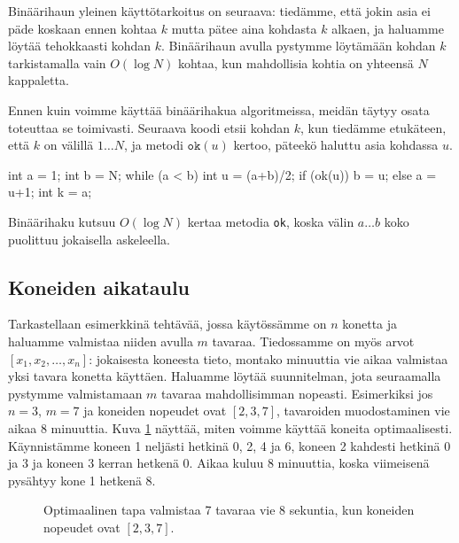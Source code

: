 Binäärihaun yleinen käyttötarkoitus on seuraava:
tiedämme, että jokin asia ei päde koskaan ennen kohtaa $k$
mutta pätee aina kohdasta $k$ alkaen,
ja haluamme löytää tehokkaasti kohdan $k$.
Binäärihaun avulla pystymme löytämään kohdan $k$
tarkistamalla vain $O(\log N)$ kohtaa,
kun mahdollisia kohtia on yhteensä $N$ kappaletta.

Ennen kuin voimme käyttää binäärihakua algoritmeissa,
meidän täytyy osata toteuttaa se toimivasti.
Seuraava koodi etsii kohdan $k$,
kun tiedämme etukäteen, että $k$ on välillä $1 \dots N$,
ja metodi $\texttt{ok}(u)$ kertoo, päteekö haluttu asia
kohdassa $u$.

\begin{code}
int a = 1;
int b = N;
while (a < b) {
    int u = (a+b)/2;
    if (ok(u)) b = u;
    else a = u+1;
}
int k = a;
\end{code}

Binäärihaku kutsuu $O(\log N)$ kertaa metodia \texttt{ok},
koska välin $a \dots b$ koko puolittuu jokaisella askeleella.

\subsection{Koneiden aikataulu}

Tarkastellaan esimerkkinä tehtävää, jossa käytössämme on $n$ konetta
ja haluamme valmistaa niiden avulla $m$ tavaraa.
Tiedossamme on myös arvot $[x_1,x_2,\dots,x_n]$:
jokaisesta koneesta tieto, montako minuuttia vie aikaa valmistaa
yksi tavara konetta käyttäen.
Haluamme löytää suunnitelman, jota seuraamalla pystymme valmistamaan
$m$ tavaraa mahdollisimman nopeasti.
Esimerkiksi jos $n=3$, $m=7$ ja koneiden nopeudet ovat $[2,3,7]$,
tavaroiden muodostaminen vie aikaa $8$ minuuttia.
Kuva \ref{fig:optkon} näyttää, miten voimme käyttää koneita optimaalisesti.
Käynnistämme koneen 1 neljästi hetkinä 0, 2, 4 ja 6,
koneen 2 kahdesti hetkinä 0 ja 3
ja koneen 3 kerran hetkenä 0.
Aikaa kuluu $8$ minuuttia, koska viimeisenä pysähtyy kone 1 hetkenä 8.

\begin{figure}
\center
{}
\caption{Optimaalinen tapa valmistaa 7 tavaraa vie 8 sekuntia,
kun koneiden nopeudet ovat $[2,3,7]$.}
\label{fig:optkon}
\end{figure}

